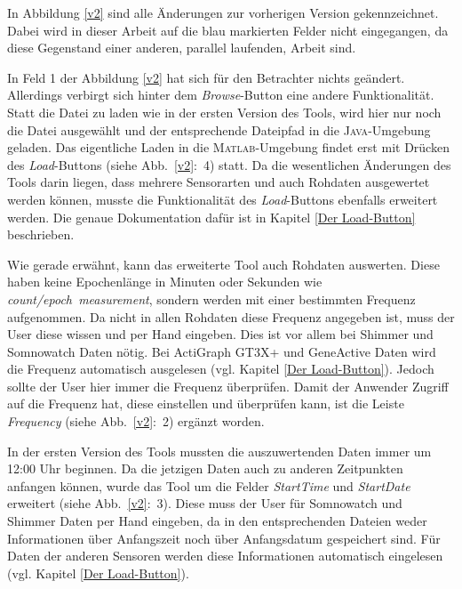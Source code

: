 \documentclass[onecolumn,german]{article}
\begin{document}
In Abbildung \ref{v2} sind alle Änderungen zur vorherigen Version gekennzeichnet. Dabei wird in dieser Arbeit auf die blau markierten Felder nicht eingegangen, da diese Gegenstand einer anderen, parallel laufenden, Arbeit sind.\newline

In Feld 1 der Abbildung \ref{v2} hat sich für den Betrachter nichts geändert. Allerdings verbirgt sich hinter dem \textit{Browse}-Button eine andere Funktionalität. Statt die Datei zu laden wie in der ersten Version des Tools, wird hier nur noch die Datei ausgewählt und der entsprechende Dateipfad in die \textsc{Java}-Umgebung geladen. Das eigentliche Laden in die \textsc{Matlab}-Umgebung findet erst mit Drücken des \textit{Load}-Buttons (siehe Abb.~\ref{v2}:~4) statt. Da die wesentlichen Änderungen des Tools darin liegen, dass mehrere Sensorarten und auch Rohdaten ausgewertet werden können, musste die Funktionalität des \textit{Load}-Buttons ebenfalls erweitert werden. Die genaue Dokumentation dafür ist in Kapitel \ref{Der Load-Button} beschrieben.\newline

Wie gerade erwähnt, kann das erweiterte Tool auch Rohdaten auswerten. Diese haben keine Epochenlänge in Minuten oder Sekunden wie \mbox{\textit{count/epoch measurement}}, sondern werden mit einer bestimmten Frequenz aufgenommen. Da nicht in allen Rohdaten diese Frequenz angegeben ist, muss der User diese wissen und per Hand eingeben. Dies ist vor allem bei Shimmer und Somnowatch Daten nötig. Bei ActiGraph GT3X+ und GeneActive Daten wird die Frequenz automatisch ausgelesen (vgl. Kapitel \ref{Der Load-Button}). Jedoch sollte der User hier immer die Frequenz überprüfen. Damit der Anwender Zugriff auf die Frequenz hat, diese einstellen und überprüfen kann, ist die Leiste \textit{Frequency} (siehe Abb.~\ref{v2}:~2) ergänzt worden.\newline

In der ersten Version des Tools mussten die auszuwertenden Daten immer um 12:00 Uhr beginnen. Da die jetzigen Daten auch zu anderen Zeitpunkten anfangen können, wurde das Tool um die Felder \textit{StartTime} und \textit{StartDate} erweitert (siehe Abb.~\ref{v2}:~3). Diese muss der User für Somnowatch und Shimmer Daten per Hand eingeben, da in den entsprechenden Dateien weder Informationen über Anfangszeit noch über Anfangsdatum gespeichert sind. Für Daten der anderen Sensoren werden diese Informationen automatisch eingelesen (vgl. Kapitel \ref{Der Load-Button}).\newline
\end{document}
